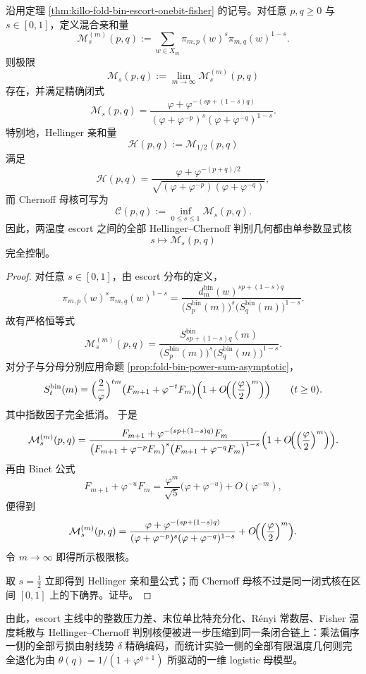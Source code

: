 \begin{theorem}\label{thm:xi-time-part65h-escort-hellinger-chernoff-kernel}
沿用定理 \ref{thm:killo-fold-bin-escort-onebit-fisher} 的记号。对任意 \(p,q\ge 0\) 与 \(s\in[0,1]\)，定义混合亲和量
\[
\mathcal M_s^{(m)}(p,q):=
\sum_{w\in X_m}\pi_{m,p}(w)^s\pi_{m,q}(w)^{1-s}.
\]
则极限
\[
\mathcal M_s(p,q):=\lim_{m\to\infty}\mathcal M_s^{(m)}(p,q)
\]
存在，并满足精确闭式
\[
\mathcal M_s(p,q)
=
\frac{\varphi+\varphi^{-(sp+(1-s)q)}}
{(\varphi+\varphi^{-p})^s(\varphi+\varphi^{-q})^{1-s}}.
\]
特别地，Hellinger 亲和量
\[
\mathcal H(p,q):=\mathcal M_{1/2}(p,q)
\]
满足
\[
\mathcal H(p,q)
=
\frac{\varphi+\varphi^{-(p+q)/2}}
{\sqrt{(\varphi+\varphi^{-p})(\varphi+\varphi^{-q})}},
\]
而 Chernoff 母核可写为
\[
\mathcal C(p,q):=\inf_{0\le s\le 1}\mathcal M_s(p,q).
\]
因此，两温度 escort 之间的全部 Hellinger--Chernoff 判别几何都由单参数显式核
\[
s\longmapsto \mathcal M_s(p,q)
\]
完全控制。
\end{theorem}
\begin{proof}
对任意 \(s\in[0,1]\)，由 escort 分布的定义，
\[
\pi_{m,p}(w)^s\pi_{m,q}(w)^{1-s}
=
\frac{d_m^{\mathrm{bin}}(w)^{sp+(1-s)q}}
{\bigl(S_p^{\mathrm{bin}}(m)\bigr)^s\bigl(S_q^{\mathrm{bin}}(m)\bigr)^{1-s}}.
\]
故有严格恒等式
\[
\mathcal M_s^{(m)}(p,q)
=
\frac{S_{sp+(1-s)q}^{\mathrm{bin}}(m)}
{\bigl(S_p^{\mathrm{bin}}(m)\bigr)^s\bigl(S_q^{\mathrm{bin}}(m)\bigr)^{1-s}}.
\]
对分子与分母分别应用命题 \ref{prop:fold-bin-power-sum-asymptotic}，
\[
S_t^{\mathrm{bin}}(m)
=
\Bigl(\frac{2}{\varphi}\Bigr)^{tm}
\bigl(F_{m+1}+\varphi^{-t}F_m\bigr)
\Bigl(1+O\!\Bigl(\Bigl(\frac{\varphi}{2}\Bigr)^m\Bigr)\Bigr)
\qquad (t\ge 0).
\]
其中指数因子完全抵消。
于是
\[
\mathcal M_s^{(m)}(p,q)
=
\frac{F_{m+1}+\varphi^{-(sp+(1-s)q)}F_m}
{\bigl(F_{m+1}+\varphi^{-p}F_m\bigr)^s
\bigl(F_{m+1}+\varphi^{-q}F_m\bigr)^{1-s}}
\Bigl(1+O\!\Bigl(\Bigl(\frac{\varphi}{2}\Bigr)^m\Bigr)\Bigr).
\]
再由 Binet 公式
\[
F_{m+1}+\varphi^{-u}F_m
=
\frac{\varphi^m}{\sqrt5}\bigl(\varphi+\varphi^{-u}\bigr)+O(\varphi^{-m}),
\]
便得到
\[
\mathcal M_s^{(m)}(p,q)
=
\frac{\varphi+\varphi^{-(sp+(1-s)q)}}
{(\varphi+\varphi^{-p})^s(\varphi+\varphi^{-q})^{1-s}}
+O\!\Bigl(\Bigl(\frac{\varphi}{2}\Bigr)^m\Bigr).
\]
令 \(m\to\infty\) 即得所示极限核。

取 \(s=\tfrac12\) 立即得到 Hellinger 亲和量公式；而 Chernoff 母核不过是同一闭式核在区间 \([0,1]\) 上的下确界。证毕。
\end{proof}

由此，escort 主线中的整数压力差、末位单比特充分化、Rényi 常数层、Fisher 温度耗散与 Hellinger--Chernoff 判别核便被进一步压缩到同一条闭合链上：乘法偏序一侧的全部亏损由射线势 \(\delta\) 精确编码，而统计实验一侧的全部有限温度几何则完全退化为由 \(\theta(q)=1/(1+\varphi^{q+1})\) 所驱动的一维 logistic 母模型。
